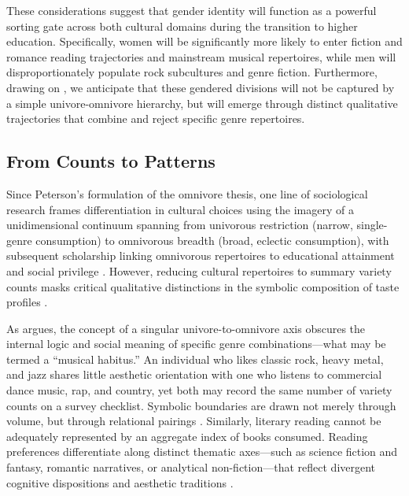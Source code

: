 \documentclass[12pt]{article}
\begin{document}
These considerations suggest that gender identity will function as a powerful sorting gate across both cultural domains during the transition to higher education. Specifically, women will be significantly more likely to enter fiction and romance reading trajectories and mainstream musical repertoires, while men will disproportionately populate rock subcultures and genre fiction. Furthermore, drawing on \citet{ma2026deep}, we anticipate that these gendered divisions will not be captured by a simple univore-omnivore hierarchy, but will emerge through distinct qualitative trajectories that combine and reject specific genre repertoires.

\subsection{From Counts to Patterns}

Since Peterson's \citeyearpar{peterson1992understanding-ce3} formulation of the omnivore thesis, one line of sociological research frames differentiation in cultural choices using the imagery of a unidimensional continuum spanning from univorous restriction (narrow, single-genre consumption) to omnivorous breadth (broad, eclectic consumption), with subsequent scholarship linking omnivorous repertoires to educational attainment and social privilege \citep{warde2008omnivorous-e77,sullivan2007omnivore-018,vries2022what-1a2}. However, reducing cultural repertoires to summary variety counts masks critical qualitative distinctions in the symbolic composition of taste profiles \citep{goldberg2011mapping-77a, hazır2015cultural-992, lizardo2014omnivorousness}. 

As \citet{rimmer2012beyond} argues, the concept of a singular univore-to-omnivore axis obscures the internal logic and social meaning of specific genre combinations---what may be termed a ``musical habitus.'' An individual who likes classic rock, heavy metal, and jazz shares little aesthetic orientation with one who listens to commercial dance music, rap, and country, yet both may record the same number of variety counts on a survey checklist. Symbolic boundaries are drawn not merely through volume, but through relational pairings \citep{sonnett2016ambivalence-352}. Similarly, literary reading cannot be adequately represented by an aggregate index of books consumed. Reading preferences differentiate along distinct thematic axes---such as science fiction and fantasy, romantic narratives, or analytical non-fiction---that reflect divergent cognitive dispositions and aesthetic traditions \citep{kraaykamp2003literary,sokolova2020does-65c}. 
\end{document}
